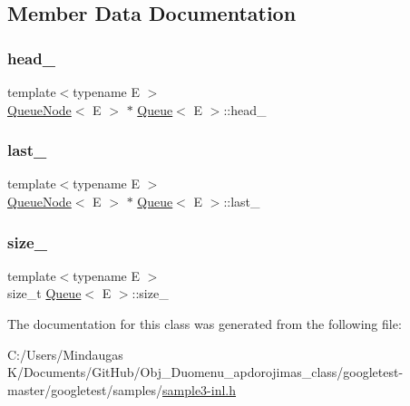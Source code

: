 \subsection{Member Data Documentation}
\mbox{\label{class_queue_a127fe95586d81eb2473b1e5d5680c6e5}} 
\subsubsection{\texorpdfstring{head\_}{head\_}}
{\footnotesize\ttfamily template$<$typename E $>$ \\
\mbox{\hyperlink{class_queue_node}{Queue\+Node}}$<$ E $>$ $\ast$ \mbox{\hyperlink{class_queue}{Queue}}$<$ E $>$\+::head\+\_\+\hspace{0.3cm}{\ttfamily [private]}}

\mbox{\label{class_queue_aaabf93e5ccdac6c4ae4568ae81081346}} 
\subsubsection{\texorpdfstring{last\_}{last\_}}
{\footnotesize\ttfamily template$<$typename E $>$ \\
\mbox{\hyperlink{class_queue_node}{Queue\+Node}}$<$ E $>$ $\ast$ \mbox{\hyperlink{class_queue}{Queue}}$<$ E $>$\+::last\+\_\+\hspace{0.3cm}{\ttfamily [private]}}

\mbox{\label{class_queue_a7ac3c0717d894e1aecc56f4ddb35c7ea}} 
\subsubsection{\texorpdfstring{size\_}{size\_}}
{\footnotesize\ttfamily template$<$typename E $>$ \\
size\+\_\+t \mbox{\hyperlink{class_queue}{Queue}}$<$ E $>$\+::size\+\_\+\hspace{0.3cm}{\ttfamily [private]}}



The documentation for this class was generated from the following file\+:\begin{DoxyCompactItemize}
\item 
C\+:/\+Users/\+Mindaugas K/\+Documents/\+Git\+Hub/\+Obj\+\_\+\+Duomenu\+\_\+apdorojimas\+\_\+class/googletest-\/master/googletest/samples/\mbox{\hyperlink{googletest-master_2googletest_2samples_2sample3-inl_8h}{sample3-\/inl.\+h}}\end{DoxyCompactItemize}
